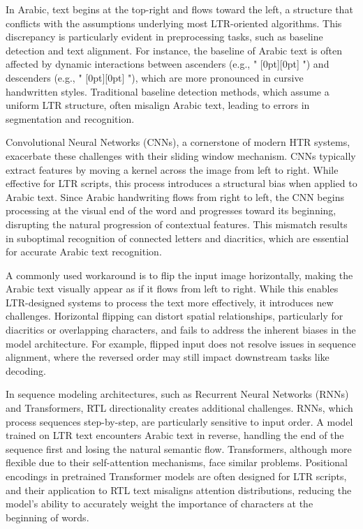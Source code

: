 \documentclass[conference]{IEEEtran}
\newcommand{\artext}[1]{%
  {\fontsize{8pt}{11pt}\selectfont \raisebox{0pt}[0pt][0pt]{\RL{#1}}}%
}
\begin{document}
In Arabic, text begins at the top-right and flows toward the left, a structure that conflicts with the assumptions underlying most LTR-oriented algorithms. This discrepancy is particularly evident in preprocessing tasks, such as baseline detection and text alignment. For instance, the baseline of Arabic text is often affected by dynamic interactions between ascenders (e.g., "\artext{ط}") and descenders (e.g., "\artext{ي}"), which are more pronounced in cursive handwritten styles. Traditional baseline detection methods, which assume a uniform LTR structure, often misalign Arabic text, leading to errors in segmentation and recognition.


Convolutional Neural Networks (CNNs), a cornerstone of modern HTR systems, exacerbate these challenges with their sliding window mechanism. CNNs typically extract features by moving a kernel across the image from left to right. While effective for LTR scripts, this process introduces a structural bias when applied to Arabic text. Since Arabic handwriting flows from right to left, the CNN begins processing at the visual end of the word and progresses toward its beginning, disrupting the natural progression of contextual features. This mismatch results in suboptimal recognition of connected letters and diacritics, which are essential for accurate Arabic text recognition.

A commonly used workaround is to flip the input image horizontally, making the Arabic text visually appear as if it flows from left to right. While this enables LTR-designed systems to process the text more effectively, it introduces new challenges. Horizontal flipping can distort spatial relationships, particularly for diacritics or overlapping characters, and fails to address the inherent biases in the model architecture. For example, flipped input does not resolve issues in sequence alignment, where the reversed order may still impact downstream tasks like decoding.

In sequence modeling architectures, such as Recurrent Neural Networks (RNNs) and Transformers, RTL directionality creates additional challenges. RNNs, which process sequences step-by-step, are particularly sensitive to input order. A model trained on LTR text encounters Arabic text in reverse, handling the end of the sequence first and losing the natural semantic flow. Transformers, although more flexible due to their self-attention mechanisms, face similar problems. Positional encodings in pretrained Transformer models are often designed for LTR scripts, and their application to RTL text misaligns attention distributions, reducing the model’s ability to accurately weight the importance of characters at the beginning of words.
\end{document}
